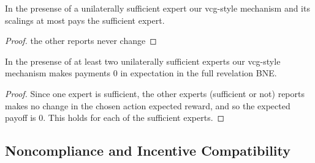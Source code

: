 \begin{lem}
	In the presense of a unilaterally sufficient expert our vcg-style mechanism and its scalings at most pays the sufficient expert.
\end{lem}

\begin{proof}
    the other reports never change 
\end{proof}


\begin{lem}
	In the presense of at least two unilaterally sufficient experts our vcg-style mechanism makes payments 0 in expectation in the full revelation BNE. 
\end{lem}

\begin{proof}
    Since one expert is sufficient, the other experts (sufficient or not) reports makes no change in the chosen action expected reward, and so the expected payoff is 0. This holds for each of the sufficient experts.
\end{proof}









	




\subsection{Noncompliance and Incentive Compatibility}

